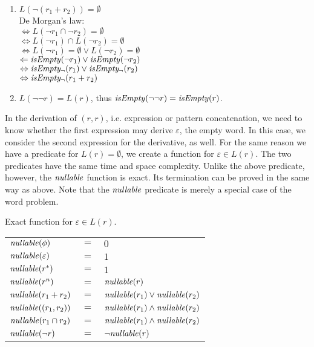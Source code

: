\begin{lem}
\begin{enumerate}[label=\textbf{(\arabic*)}]
      \item
         $L(\neg(r_1 + r_2)) = \emptyset$ \\
         De Morgan's law: \\
         $\Leftrightarrow L(\neg r_1 \cap \neg r_2) = \emptyset$ \\
         $\Leftrightarrow L(\neg r_1) \cap L(\neg r_2) = \emptyset$ \\
         $\Leftrightarrow L(\neg r_1) = \emptyset \vee L(\neg r_2) = \emptyset$ \\
         $\Leftarrow \mathit{isEmpty}(\neg r_1) \vee \mathit{isEmpty}(\neg r_2)$ \\
         $\Leftrightarrow \mathit{isEmpty_\neg}(r_1) \vee \mathit{isEmpty_\neg}(r_2)$ \\
         $\Leftrightarrow \mathit{isEmpty_\neg}(r_1 + r_2)$


      \item
         $L(\neg\neg r) = L(r)$, thus $\mathit{isEmpty}(\neg\neg r) = \mathit{isEmpty}(r)$.

   \end{enumerate}
\end{lem}


In the derivation of $(r,r)$, i.e. expression or pattern concatenation, we need
to know whether the first expression may derive $\varepsilon$, the empty word.
In this case, we consider the second expression for the derivative, as well. For
the same reason we have a predicate for $L(r) = \emptyset$, we create a function
for $\varepsilon \in L(r)$. The two predicates have the same time and space
complexity. Unlike the above predicate, however, the $\mathit{nullable}$ function is
exact. Its termination can be proved in the same way as above. Note that the
$\mathit{nullable}$ predicate is merely a special case of the word problem.

\begin{defn}
   \label{defn-nullable}
   Exact function for $\varepsilon \in L(r)$.

   \begin{tabular}{lll}
      $\mathit{nullable}(\phi)$		& $=$ & $0$ \\
      $\mathit{nullable}(\varepsilon)$	& $=$ & $1$ \\
      $\mathit{nullable}(r^*)$		& $=$ & $1$ \\
      $\mathit{nullable}(r^n)$		& $=$ & $\mathit{nullable}(r)$ \\
      $\mathit{nullable}(r_1 + r_2)$	& $=$ & $\mathit{nullable}(r_1) \vee \mathit{nullable}(r_2)$ \\
      $\mathit{nullable}((r_1, r_2))$	& $=$ & $\mathit{nullable}(r_1) \wedge \mathit{nullable}(r_2)$ \\
      $\mathit{nullable}(r_1 \cap r_2)$	& $=$ & $\mathit{nullable}(r_1) \wedge \mathit{nullable}(r_2)$ \\
      $\mathit{nullable}(\neg r)$	& $=$ & $\neg\mathit{nullable}(r)$ \\
   \end{tabular}

\end{defn}

